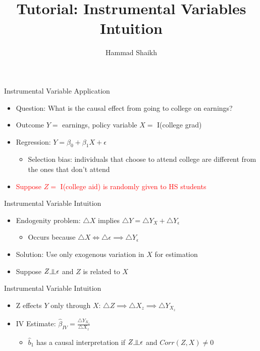 \documentclass[compress]{beamer}
\title[Lecture 7]{Tutorial: Instrumental Variables Intuition}
\author[Hammad Shaikh]{Hammad Shaikh}
\date{}
\newcommand{\indep}{\rotatebox[origin=c]{90}{$\models$}}
\begin{document}
\frame{\titlepage}

\begin{frame}{Instrumental Variable Application}

\begin{itemize}
\vspace*{-1cm}
\setlength\itemsep{2.5em}
\item Question: What is the causal effect from going to college on earnings?
\item Outcome $Y =$ earnings, policy variable $X =$ I(college grad)
\item Regression: $Y = \beta_{0} + \beta_{1}X + \epsilon$
\begin{itemize}
\item Selection bias: individuals that choose to attend college are different from the ones that don't attend
\end{itemize}
\item \textcolor{red}{Suppose $Z = $ I(college aid) is randomly given to HS students} 
\end{itemize}

\end{frame}

\begin{frame}{Instrumental Variable Intuition}

\begin{itemize}
\vspace*{-1.5cm}
\setlength\itemsep{4em}
\item Endogenity problem: $\triangle X$ implies $\triangle Y = \triangle Y_{X} + \triangle Y_{\epsilon}$
\begin{itemize}
\item Occurs because $\triangle X  \iff \triangle \epsilon \implies \triangle Y_{\epsilon}$
\end{itemize}

\item Solution: Use only exogenous variation in $X$ for estimation
\item Suppose $Z  \indep  \epsilon$ and $Z$ is related to $X$

\end{itemize}

\end{frame}

\begin{frame}{Instrumental Variable Intuition}

\begin{itemize}
\vspace*{-1.5cm}
\setlength\itemsep{4.5em}
\item Z effects $Y$ only through $X$: $\triangle Z \implies \triangle X_{z} \implies \triangle Y_{X_z} $
\item IV Estimate: $\widehat{\beta}_{IV} = \frac{\triangle Y_{X_{z}}}{\triangle X_{z}}$
\begin{itemize}
\item $\widehat{b}_{1}$ has a causal interpretation if $Z \indep \epsilon$ and $Corr(Z,X) \ne 0$
\end{itemize}
\end{itemize}

\end{frame}
\end{document}
